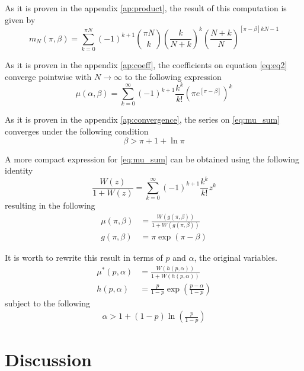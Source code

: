 \documentclass{article}
\newcommand{\ppar}[1]{\left( #1 \right)}
\newcommand{\spar}[1]{\left[ #1 \right]}
\begin{document}
As it is proven in the appendix \ref{ap:product}, the result of this computation is given by
\begin{equation}
m_N(\pi, \beta) =
    \sum_{k=0}^{\pi N}
    (-1)^{k+1} 
    \binom{\pi N}{k}
    \ppar{\frac{k}{N+k}}^k
    \ppar{\frac{N+k}{N}}^{\spar{\pi-\beta}k N -1}
    \label{eq:eq2}
\end{equation}

As it is proven in the appendix \ref{ap:coeff}, the coefficients on equation \eqref{eq:eq2} converge pointwise with $N\rightarrow \infty$ to the following expression
\begin{equation}
    \mu(\alpha, \beta) =
    \sum_{k=0}^{\infty}
    (-1)^{k+1} \frac{k^k}{k!} 
    \ppar{\pi
    e^{\spar{\pi-\beta}} }^k
    \label{eq:mu_sum}
\end{equation}

As it is proven in the appendix \ref{ap:convergence},
the series on \eqref{eq:mu_sum} converges under the following condition
\begin{equation}
    \beta > \pi + 1 + \ln{\pi}
\end{equation}

A more compact expression for \eqref{eq:mu_sum} can be obtained using the following identity
\begin{equation}
    \frac{W\ppar{z}}{1+W\ppar{z}}
    =
    \sum_{k=0}^{\infty}
    (-1)^{k+1} \frac{k^k}{k!} 
    z^k
\end{equation}
resulting in the following 
\begin{align}
    \mu\ppar{\pi, \beta} &= \frac{W\ppar{g\ppar{\pi, \beta}}}{1+W\ppar{g\ppar{\pi, \beta}}}
    \\
    g\ppar{\pi, \beta} &=
    \pi \exp{\ppar{\pi - \beta}}
\end{align}

It is worth to rewrite this result in terms of $p$ and $\alpha$, the original variables.
\begin{align}
    {\mu^*}\ppar{p, \alpha} &= \frac{W\ppar{h\ppar{p, \alpha}}}{1+W\ppar{h\ppar{p, \alpha}}}
    \\
    h\ppar{p, \alpha} &=
    \frac{p}{1-p} \exp{\ppar{\frac{p-\alpha}{1-p}}}
\end{align}
subject to the following
\begin{align}
    \alpha > 1 + \ppar{1-p} \ln{\ppar{\frac{p}{1-p}}} 
\end{align}

\section{Discussion}
\end{document}
